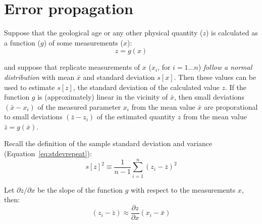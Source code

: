 \section{Error propagation}
\label{sec:linearerrorprop}

Suppose that the geological age or any other physical quantity ($z$)
is calculated as a function ($g$) of some measurements ($x$):
\begin{equation}
z = g(x)
\label{eq:zgx}
\end{equation}

\noindent and suppose that replicate measurements of $x$ ($x_i$, for
$i=1...n$) \emph{follow a normal distribution} with mean $\bar{x}$ and
standard deviation $s[x]$. Then these values can be used to estimate
$s[z]$, the standard deviation of the calculated value $z$.  If the
function $g$ is (approximately) linear in the vicinity of $\bar{x}$,
then small deviations $(\bar{x}-x_i)$ of the measured parameter $x_i$
from the mean value $\bar{x}$ are proporational to small deviations
$(\bar{z}-z_i)$ of the estimated quantity $z$ from the mean value
$\bar{z}=g(\overline{x})$.\medskip

Recall the definition of the sample standard deviation and variance
(Equation~\ref{eq:stdevrepeat}):
\begin{equation}
s[z]^2 \equiv \frac{1}{n-1} \sum_{i=1}^{n} (z_i-\bar{z})^2
\label{eq:varz}
\end{equation}

Let $\partial{z}/\partial{x}$ be the slope of the function $g$ with
respect to the measurements $x$, then:
\begin{equation}
(z_i-\bar{z}) \approx \frac{\partial z}{\partial x} (x_i-\bar{x})
\label{eq:zi-z}
\end{equation}

